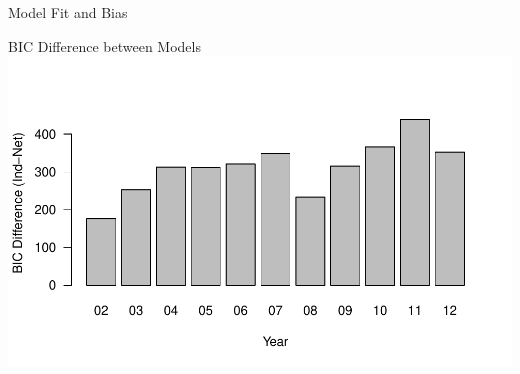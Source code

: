 \documentclass{beamer}
\begin{document}
\begin{frame}{Model Fit and Bias}


    \centering
    BIC Difference between Models\\
\includegraphics[scale=.6]{slides_figures/BICdiff.pdf}  



\end{frame}
\end{document}
